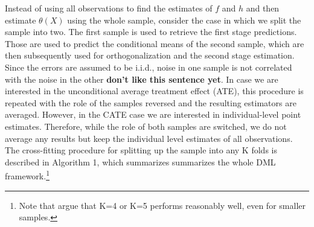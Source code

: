 Instead of using all observations to find the estimates of $f$ and $h$ and then estimate $\theta(X)$ using the whole sample, consider the case in which we split the sample into two. The first sample is used to retrieve the first stage predictions. Those are used to predict the conditional means of the second sample, which are then subsequently used for orthogonalization and the second stage estimation. Since the errors are assumed to be i.i.d., noise in one sample is not correlated with the noise in the other \textbf{don't like this sentence yet}. In case we are interested in the unconditional average treatment effect (ATE), this procedure is repeated with the role of the samples reversed and the resulting estimators are averaged. However, in the CATE case we are interested in individual-level point estimates. Therefore, while the role of both samples are switched, we do not average any results but keep the individual level estimates of all observations. The cross-fitting procedure for splitting up the sample into any K folds is described in Algorithm 1, which summarizes summarizes the whole DML framework.\footnote{Note that \cite{DML2017} argue that K=4 or K=5 performs reasonably well, even for smaller samples.} 

